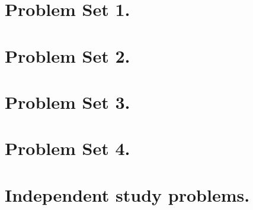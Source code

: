    \chapter{Problem Set 1.}

      
      
      
      
      

   \chapter{Problem Set 2.}

      
      
      
      

%
{%
\relax%
}%
{%
   \chapter{Problem Set 3.}

      
      
      
      

   \chapter{Problem Set 4.}

      
      
      
      
%
}%

   \chapter{Independent study problems.}

      
      
